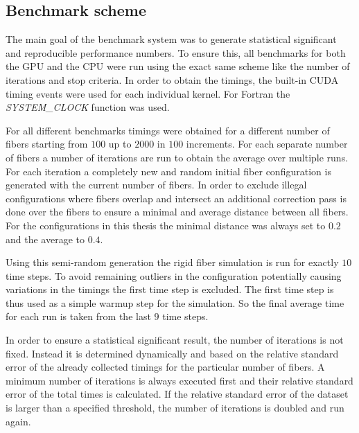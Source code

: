\documentclass[a4paper,11pt]{kth-mag}
\begin{document}
\subsection{Benchmark scheme}

The main goal of the benchmark system was to generate statistical significant and reproducible performance numbers. To ensure this, all benchmarks for both the GPU and the CPU were run using the exact same scheme like the number of iterations and stop criteria. In order to obtain the timings, the built-in CUDA timing events were used for each individual kernel. For Fortran the \emph{SYSTEM\_CLOCK} function was used.

For all different benchmarks timings were obtained for a different number of fibers starting from $100$ up to $2000$ in $100$ increments. For each separate number of fibers a number of iterations are run to obtain the average over multiple runs. For each iteration a completely new and random initial fiber configuration is generated with the current number of fibers. In order to exclude illegal configurations where fibers overlap and intersect an additional correction pass is done over the fibers to ensure a minimal and average distance between all fibers. For the configurations in this thesis the minimal distance was always set to $0.2$ and the average to $0.4$.

Using this semi-random generation the rigid fiber simulation is run for exactly $10$ time steps. To avoid remaining outliers in the configuration potentially causing variations in the timings the first time step is excluded. The first time step is thus used as a simple warmup step for the simulation. So the final average time for each run is taken from the last $9$ time steps.

In order to ensure a statistical significant result, the number of iterations is not fixed. Instead it is determined dynamically and based on the relative standard error of the already collected timings for the particular number of fibers. A minimum number of iterations is always executed first and their relative standard error of the total times is calculated. If the relative standard error of the dataset is larger than a specified threshold, the number of iterations is doubled and run again.
\end{document}
